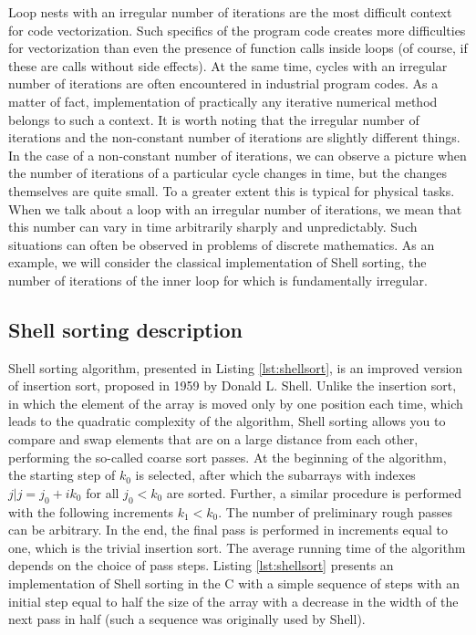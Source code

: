 \documentclass[
11pt,%
tightenlines,%
twoside,%
onecolumn,%
nofloats,%
nobibnotes,%
nofootinbib,%
superscriptaddress,%
noshowpacs,%
centertags]%
{revtex4}
\begin{document}
Loop nests with an irregular number of iterations are the most difficult context for code vectorization.
Such specifics of the program code creates more difficulties for vectorization than even the presence of function calls inside loops (of course, if these are calls without side effects).
At the same time, cycles with an irregular number of iterations are often encountered in industrial program codes.
As a matter of fact, implementation of practically any iterative numerical method belongs to such a context.
It is worth noting that the irregular number of iterations and the non-constant number of iterations are slightly different things.
In the case of a non-constant number of iterations, we can observe a picture when the number of iterations of a particular cycle changes in time, but the changes themselves are quite small.
To a greater extent this is typical for physical tasks.
When we talk about a loop with an irregular number of iterations, we mean that this number can vary in time arbitrarily sharply and unpredictably.
Such situations can often be observed in problems of discrete mathematics.
As an example, we will consider the classical implementation of Shell sorting, the number of iterations of the inner loop for which is fundamentally irregular.

\subsection{Shell sorting description}

Shell sorting algorithm, presented in Listing \ref{lst:shellsort}, is an improved version of insertion sort, proposed in 1959 by Donald L. Shell. 
Unlike the insertion sort, in which the element of the array is moved only by one position each time, which leads to the quadratic complexity of the algorithm, Shell sorting allows you to compare and swap elements that are on a large distance from each other, performing the so-called coarse sort passes. At the beginning of the algorithm, the starting step of $ k_0 $ is selected, after which the subarrays with indexes $ {j | j = j_0 + ik_0} $ for all $ j_0  < k_0 $ are sorted. 
Further, a similar procedure is performed with the following increments $ k_1  < k_0 $. 
The number of preliminary rough passes can be arbitrary. In the end, the final pass is performed in increments equal to one, which is the trivial insertion sort. 
The average running time of the algorithm depends on the choice of pass steps. 
Listing \ref{lst:shellsort} presents an implementation of Shell sorting in the C with a simple sequence of steps with an initial step equal to half the size of the array with a decrease in the width of the next pass in half (such a sequence was originally used by Shell). 
\end{document}
